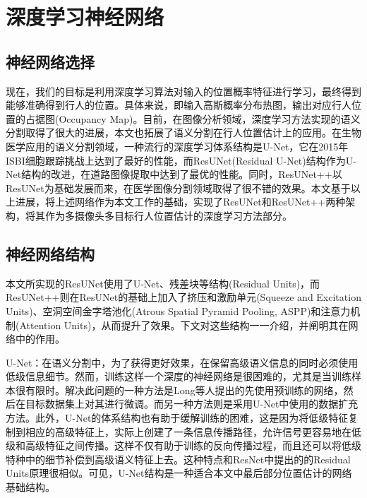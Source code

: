 \section{深度学习神经网络}

\subsection{神经网络选择}

现在，我们的目标是利用深度学习算法对输入的位置概率特征进行学习，最终得到能够准确得到行人的位置。具体来说，即输入高斯概率分布热图，输出对应行人位置的占据图(Occupancy Map)。目前，在图像分析领域，深度学习方法实现的语义分割取得了很大的进展\cite{2016V, 2015U, 2017Road}，本文也拓展了语义分割在行人位置估计上的应用。在生物医学应用的语义分割领域，一种流行的深度学习体系结构是U-Net\cite{2015U}，它在2015年ISBI细胞跟踪挑战上达到了最好的性能，而ResUNet(Residual U-Net)\cite{2017Road}结构作为U-Net结构的改进，在道路图像提取中达到了最优的性能。同时，ResUNet++\cite{2019ResUNet}以ResUNet为基础发展而来，在医学图像分割领域取得了很不错的效果。本文基于以上进展，将上述网络作为本文工作的基础，实现了ResUNet和ResUNet++两种架构，将其作为多摄像头多目标行人位置估计的深度学习方法部分。

\subsection{神经网络结构}

本文所实现的ResUNet使用了U-Net、残差块等结构(Residual Units)，而ResUNet++则在ResUNet的基础上加入了挤压和激励单元(Squeeze and Excitation Units)、空洞空间金字塔池化(Atrous Spatial Pyramid Pooling, ASPP)和注意力机制(Attention Units)，从而提升了效果。下文对这些结构一一介绍，并阐明其在网络中的作用。

U-Net：在语义分割中，为了获得更好效果，在保留高级语义信息的同时必须使用低级信息细节。然而，训练这样一个深度的神经网络是很困难的，尤其是当训练样本很有限时。解决此问题的一种方法是Long等人\cite{2015Fully}提出的先使用预训练的网络，然后在目标数据集上对其进行微调。而另一种方法则是采用U-Net\cite{2015U}中使用的数据扩充方法。此外，U-Net的体系结构也有助于缓解训练的困难，这是因为将低级特征复制到相应的高级特征上，实际上创建了一条信息传播路径，允许信号更容易地在低级和高级特征之间传播。这样不仅有助于训练的反向传播过程，而且还可以将低级特种中的细节补偿到高级语义特征上去。这种特点和ResNet\cite{he2016deep}中提出的的Residual Units原理很相似。可见，U-Net结构是一种适合本文中最后部分位置估计的网络基础结构。

